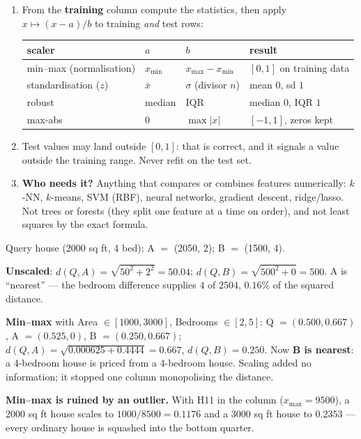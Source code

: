 \documentclass[11pt]{article}
\newcommand{\method}[1]{\begin{keyidea}[The method: #1]}
\newcommand{\IQR}{\mathrm{IQR}}
\begin{document}
\method{the four scalers}
\begin{enumerate}
  \item From the \textbf{training} column compute the statistics, then apply
    $x \mapsto (x - a)/b$ to training \emph{and} test rows:
    \begin{center}\small
    \begin{tabular}{@{}llll@{}}
    \toprule
    scaler & $a$ & $b$ & result\\ \midrule
    min--max (normalisation) & $x_{\min}$ & $x_{\max} - x_{\min}$ & $[0, 1]$ on training data\\
    standardisation ($z$) & $\bar x$ & $\sigma$ (divisor $n$) & mean $0$, sd $1$\\
    robust & median & $\IQR$ & median $0$, IQR $1$\\
    max-abs & $0$ & $\max|x|$ & $[-1, 1]$, zeros kept\\
    \bottomrule
    \end{tabular}
    \end{center}
  \item Test values may land outside $[0, 1]$: that is correct, and it
    signals a value outside the training range. Never refit on the test set.
  \item \textbf{Who needs it?} Anything that compares or combines features
    numerically: $k$-NN, $k$-means, SVM (RBF), neural networks, gradient
    descent, ridge/lasso. Not trees or forests (they split one feature at a
    time on order), and not least squares by the exact formula.
\end{enumerate}
\end{keyidea}

\begin{worked}
Query house (2000 sq ft, 4 bed); A $=$ (2050, 2); B $=$ (1500, 4).

\textbf{Unscaled}: $d(Q, A) = \sqrt{50^2 + 2^2} = 50.04$;
$d(Q, B) = \sqrt{500^2 + 0} = 500$. A is ``nearest'' --- the bedroom
difference supplies $4$ of $2504$, $0.16\%$ of the squared distance.

\textbf{Min--max} with Area $\in [1000, 3000]$, Bedrooms $\in [2, 5]$:
Q $= (0.500, 0.667)$, A $= (0.525, 0)$, B $= (0.250, 0.667)$;
$d(Q, A) = \sqrt{0.000625 + 0.4444} = 0.667$, $d(Q, B) = 0.250$. Now
\textbf{B is nearest}: a 4-bedroom house is priced from a 4-bedroom house.
Scaling added no information; it stopped one column monopolising the
distance.

\textbf{Min--max is ruined by an outlier.} With H11 in the column
($x_{\max} = 9500$), a 2000 sq ft house scales to $1000/8500 = 0.1176$ and a
3000 sq ft house to $0.2353$ --- every ordinary house is squashed into the
bottom quarter.
\end{worked}
\end{document}
